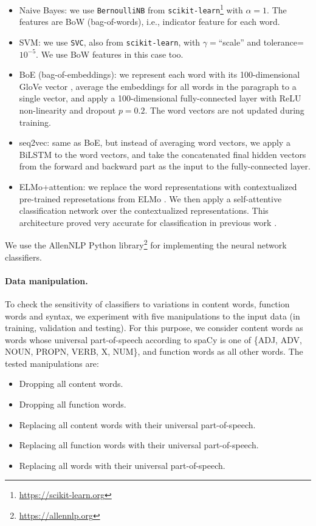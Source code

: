 \documentclass[11pt,a4paper]{article}
\begin{document}
\begin{itemize}
  \item Naive Bayes: we use \texttt{BernoulliNB} from
  \texttt{scikit-learn}\footnote{\url{https://scikit-learn.org}}
  with $\alpha=1$.
  The features are BoW (bag-of-words), i.e., indicator feature for each word.
  \item SVM: we use \texttt{SVC}, also from \texttt{scikit-learn},
  with $\gamma=$``scale'' and tolerance=$10^{-5}$.
  We use BoW features in this case too.
  \item BoE (bag-of-embeddings): we represent each word with its 100-dimensional
  GloVe vector \cite{pennington2014glove}, average the embeddings for all words in the paragraph
  to a single vector, and apply a 100-dimensional fully-connected layer with
  ReLU non-linearity and dropout $p=0.2$.
  The word vectors are not updated during training.
  \item seq2vec: same as BoE, but instead of averaging word vectors,
  we apply a BiLSTM to the word vectors, and take the concatenated
  final hidden vectors from the forward and backward part as the input to the
  fully-connected layer.
  \item ELMo+attention: we replace the word representations with contextualized
  pre-trained represetations from ELMo \cite{Peters:2018}. We then apply a self-attentive
  classification network \cite{mccann2017learned} over the contextualized representations. This architecture proved very accurate for classification in
  previous work \cite{W18-5427,D18-1401}.
\end{itemize}

We use the AllenNLP Python library\footnote{\url{https://allennlp.org}}
\cite{Gardner2017AllenNLP} for implementing the neural network classifiers.

\paragraph{Data manipulation.}

To check the sensitivity of classifiers to variations in content words,
function words and syntax, we experiment with five manipulations to the input
data (in training, validation and testing).
For this purpose, we consider content words as words whose universal part-of-speech
according to spaCy is one of \{ADJ, ADV, NOUN, PROPN, VERB, X, NUM\},
and function words as all other words.
The tested manipulations are:

\begin{itemize}
  \item Dropping all content words.
  \item Dropping all function words.
  \item Replacing all content words with their universal part-of-speech.
  \item Replacing all function words with their universal part-of-speech.
  \item Replacing all words with their universal part-of-speech.
\end{itemize}
\end{document}
